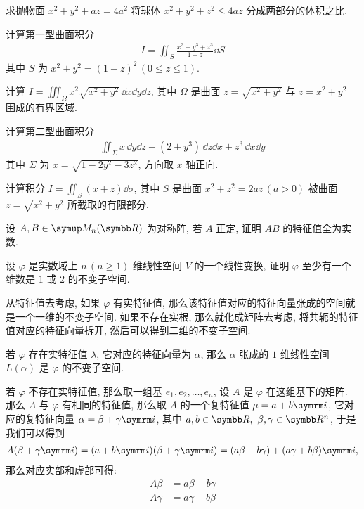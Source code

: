 \begin{exercise}[resume=exer]
        \item 求抛物面 $ x^{2} + y^{2} + az = 4a^{2} $ 将球体 $ x^{2} + y^{2} + z^{2} \le 4az $ 分成两部分的体积之比.
        \item 计算第一型曲面积分
        \begin{align*}
            I = \iint_{S} \frac{x^{3} + y^{3} + z^{3}}{1-z} \dd{S}
        \end{align*}
        其中 $ S $ 为 $ x^{2} + y^{2} = (1-z)^{2}\,(0 \le z \le 1) $. 
        \item 计算 $ I = \iiint_{\Omega} x^{2}\sqrt{x^{2} + y^{2}}\,\dd x\dd y\dd z $, 其中 $ \Omega $ 是曲面 $ z = \sqrt{x^{2} + y^{2}} $ 与 $ z = x^{2} + y^{2} $ 围成的有界区域.
        \item 计算第二型曲面积分
        \begin{align*}
            \iint_{\Sigma} x\,\dd y\dd z + (2 + y^{3})\,\dd z\dd x + z^{3}\,\dd x\dd y
        \end{align*}
        其中 $ \Sigma $ 为 $ x = \sqrt{1 - 2y^{2} - 3z^{2}} $, 方向取 $ x $ 轴正向.
        \item 计算积分 $ I = \iint_{S} (x + z) \dd{\sigma} $, 其中 $ S $ 是曲面 $ x^{2} + z^{2} = 2az\,(a > 0) $ 被曲面 $ z = \sqrt{x^{2} + y^{2}} $ 所截取的有限部分.
        \item 设 $ A, B \in \MM $ 为对称阵, 若 $ A $ 正定, 证明 $ AB $ 的特征值全为实数.
        \item 设 $ \varphi $ 是实数域上 $ n\,(n\ge 1) $ 维线性空间 $ V $ 的一个线性变换, 证明 $ \varphi $ 至少有一个维数是 $ 1 $ 或 $ 2 $ 的不变子空间.
        \begin{hint}
            从特征值去考虑, 如果 $ \varphi $ 有实特征值, 那么该特征值对应的特征向量张成的空间就是一个一维的不变子空间. 如果不存在实根, 那么就化成矩阵去考虑, 将共轭的特征值对应的特征向量拆开, 然后可以得到二维的不变子空间.
        \end{hint}
        \begin{answer}
            若 $ \varphi $ 存在实特征值 $ \lambda $, 它对应的特征向量为 $ \alpha $, 那么 $ \alpha $ 张成的 $ 1 $ 维线性空间 $ L(\alpha) $ 是 $ \varphi $ 的不变子空间. 

            若 $ \varphi $ 不存在实特征值, 那么取一组基 $ e_{1}, e_{2}, \dots, e_{n} $, 设 $ A $ 是 $ \varphi $ 在这组基下的矩阵. 那么 $ A $ 与 $ \varphi $ 有相同的特征值, 那么取 $ A $ 的一个复特征值 $ \mu = a + b\mi $, 它对应的复特征向量 $ \alpha = \beta + \gamma\mi $, 其中 $ a, b \in \R,\ \beta, \gamma \in \R^{n} $, 于是我们可以得到
            \begin{align*}
                A(\beta + \gamma\mi) = (a + b\mi)(\beta + \gamma\mi) = (a\beta - b\gamma) + (a\gamma + b\beta)\mi,
            \end{align*}
            那么对应实部和虚部可得:
            \begin{align*}
                A\beta & = a\beta - b\gamma\\
                A\gamma & = a\gamma + b\beta
            \end{align*}


\end{answer}
\end{exercise}
